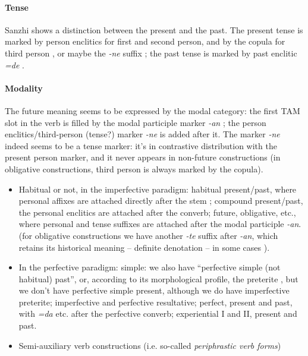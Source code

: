 \documentclass[a4paper, oneside, 12pt]{report}
\newcommand*{\citesec}[1]{\S~{#1}}
\newcommand*{\citepage}[1]{p.~{#1}}
\newcommand*{\citepages}[1]{pp.~{#1}}
\newcommand*{\term}[1]{\emph{#1}}
\newcommand{\form}[1]{\emph{#1}}
\begin{document}
\paragraph*{Tense} Sanzhi shows a distinction between the present and the past.
The present tense is marked by 
person enclitics for first and second person, 
and by the copula for third person \citep[\citepage{250}]{forker2020grammar},
or maybe the \form{-ne} suffix \citep[\citepage{253}]{forker2020grammar};
the past tense is marked by past enclitic \form{=de} \citep[\citepage{252}]{forker2020grammar}.

\paragraph*{Modality} 
The future meaning seems to be expressed by  
the modal category: the first TAM slot in the verb is filled by 
the modal participle marker \form{-an} \citep[\citepage{18.1.2.2}]{forker2020grammar};
the person enclitics/third-person (tense?) marker \form{-ne} is added after it.
The marker \form{-ne} indeed seems to be a tense marker: 
it's in contrastive distribution with the present person marker,
and it never appears in non-future constructions
(in obligative constructions, third person is always marked by the copula).

\begin{itemize}
    \item Habitual or not, in the imperfective paradigm: 
    habitual present/past, where personal affixes are attached  
    directly after the stem \citep[\citepages{243, 246}]{forker2020grammar};
    compound present/past, the personal enclitics are attached 
    after the converb; 
    future, obligative, etc., where personal and tense suffixes are attached 
    after the modal participle \form{-an}. 
    (for obligative constructions we have another \form{-te} suffix after \form{-an},
    which retains its historical meaning -- definite denotation -- 
    in some cases \citep[\citepage{256}]{forker2020grammar}).

    \item In the perfective paradigm:
    simple: we also have ``perfective simple (not habitual) past'', 
    or, according to its morphological profile, the preterite 
    \citep[\citesec{14.2.2}]{forker2020grammar},
    but we don't have perfective simple present,
    although we do have imperfective preterite;
    imperfective and perfective resultative; 
    perfect, present and past, with \form{=da} etc. after the perfective converb; 
    experiential I and II, present and past. 
    \item Semi-auxiliary verb constructions (i.e. so-called \term{periphrastic verb forms})
\end{itemize}
\end{document}
